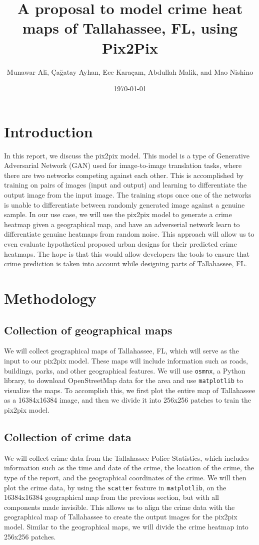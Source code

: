 \documentclass{article}
\title{A proposal to model crime heat maps of Tallahassee, FL, using Pix2Pix}
\author{Munawar Ali, Çağatay Ayhan, Ece Karaçam, Abdullah Malik, and Mao Nishino}
\date{\today}
\begin{document}
\maketitle

\section{Introduction}
In this report, we discuss the pix2pix model. This model is a type of Generative Adversarial Network (GAN) used for image-to-image translation tasks, where there are two networks competing against each other. This is accomplished by training on pairs of images (input and output) and learning to differentiate the output image from the input image. The training stops once one of the networks is unable to differentiate between randomly generated image against a genuine sample. In our use case, we will use the pix2pix model to generate a crime heatmap given a geographical map, and have an adverserial network learn to differentiate genuine heatmaps from random noise. This approach will allow us to even evaluate hypothetical proposed urban designs for their predicted crime heatmaps. The hope is that this would allow developers the tools to ensure that crime prediction is taken into account while designing parts of Tallahassee, FL.

\section{Methodology}
\subsection{Collection of geographical maps}
We will collect geographical maps of Tallahassee, FL, which will serve as the input to our pix2pix model. These maps will include information such as roads, buildings, parks, and other geographical features. We will use \verb|osmnx|, a Python library, to download OpenStreetMap data for the area and use \verb|matplotlib| to visualize the maps. To accomplish this, we first plot the entire map of Tallahassee as a 16384x16384 image, and then we divide it into 256x256 patches to train the pix2pix model.
\subsection{Collection of crime data}
We will collect crime data from the Tallahassee Police Statistics, which includes information such as the time and date of the crime, the location of the crime, the type of the report, and the geographical coordinates of the crime. We will then plot the crime data, by using the \verb|scatter| feature in \verb|matplotlib|, on the 16384x16384 geographical map from the previous section, but with all components made invisible. This allows us to align the crime data with the geographical map of Tallahassee to create the output images for the pix2pix model. Similar to the geographical maps, we will divide the crime heatmap into 256x256 patches.
\end{document}
